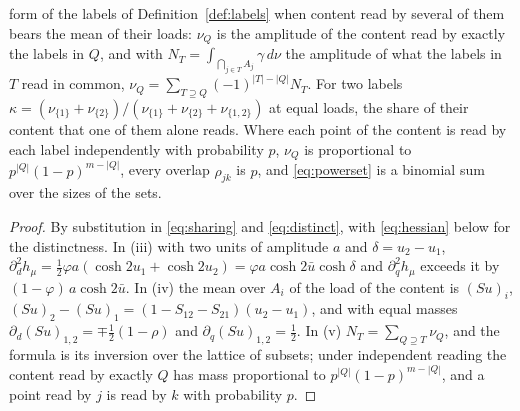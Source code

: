 \begin{proposition}
\begin{enumerate}[label=\emph{(\roman*)},itemsep=1pt]
form of the labels of Definition~\ref{def:labels} when content read by
several of them bears the mean of their loads: $\nu_Q$ is the amplitude
of the content read by exactly the labels in $Q$, and with
$N_T=\int_{\bigcap_{j\in T}A_j}\gamma\,d\nu$ the amplitude of what the
labels in $T$ read in common,
$\nu_Q=\sum_{T\supseteq Q}(-1)^{|T|-|Q|}N_T$. For two labels
$\kappa=(\nu_{\{1\}}+\nu_{\{2\}})/(\nu_{\{1\}}+\nu_{\{2\}}+\nu_{\{1,2\}})$
at equal loads, the share of their content that one of them alone reads.
Where each point of the content is read by each label independently with
probability $p$, $\nu_Q$ is proportional to $p^{|Q|}(1-p)^{m-|Q|}$, every
overlap $\rho_{jk}$ is $p$, and \eqref{eq:powerset} is a binomial sum
over the sizes of the sets.
\end{enumerate}
\end{proposition}

\begin{proof}
By substitution in \eqref{eq:sharing} and \eqref{eq:distinct}, with
\eqref{eq:hessian} below for the distinctness. In (iii) with two units of
amplitude $a$ and $\delta=u_2-u_1$, $\partial_d^2h_\mu=\tfrac12\varphi
a(\cosh2u_1+\cosh2u_2)=\varphi a\cosh2\bar u\cosh\delta$ and
$\partial_q^2h_\mu$ exceeds it by $(1-\varphi)\,a\cosh2\bar u$. In (iv)
the mean over $A_i$ of the load of the content is $(Su)_i$,
$(Su)_2-(Su)_1=(1-S_{12}-S_{21})(u_2-u_1)$, and with equal masses
$\partial_d(Su)_{1,2}=\mp\tfrac12(1-\rho)$ and
$\partial_q(Su)_{1,2}=\tfrac12$. In (v) $N_T=\sum_{Q\supseteq T}\nu_Q$,
and the formula is its inversion over the lattice of subsets; under
independent reading the content read by exactly $Q$ has mass
proportional to $p^{|Q|}(1-p)^{m-|Q|}$, and a point read by $j$ is read
by $k$ with probability $p$.
\end{proof}

